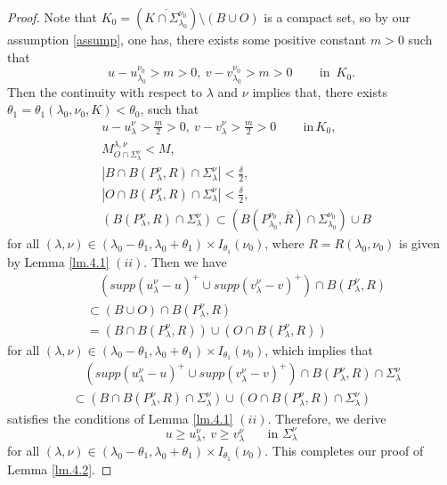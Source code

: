 \documentclass[12pt]{amsart}
\theoremstyle{definition}
\theoremstyle{remark}
\theoremstyle{conclusion}
\theoremstyle{conjecture}
\numberwithin{equation}{section}
\begin{document}
\begin{proof}
Note that $K_0=(\overline{K\cap\Sigma_{\lambda_0}^{\nu_0}}) \setminus (B\cup O)$ is a compact set, so by our assumption \eqref{assump}, one has, there exists some positive constant $m>0$ such that
$$ u-u_{\lambda_0}^{\nu_0}>m>0,\  v-v_{\lambda_0}^{\nu_0}>m>0 \quad\quad \,\mbox{in}\,\,\, K_0. $$
Then the continuity with respect to $\lambda$ and $\nu$ implies that, there exists $\theta_1=\theta_1(\lambda_0,\nu_0,K)<\theta_0$, such that
\begin{align*}
& u-u^{\nu}_{\lambda}> \frac{m}{2}>0,\ v-v^{\nu}_{\lambda}> \frac{m}{2}>0 \qquad \,\mbox{in}\,K_0, \\
& M_{O\cap \Sigma_\lambda^\nu}^{\lambda,\nu}< M, \\
& |B\cap B(P_\lambda^\nu,R) \cap \Sigma_\lambda^\nu |< \frac{\delta}{2},\\
& |O\cap B(P_\lambda^\nu,R) \cap \Sigma_\lambda^\nu |< \frac{\delta}{2},\\
& (B(P_\lambda^\nu,R)\cap \Sigma_\lambda^\nu)\subset (B(P_{\lambda_0}^{\nu_0},\overline{R})\cap \Sigma_{\lambda_0}^{\nu_0}) \cup B
\end{align*}
for all $(\lambda,\nu)\in (\lambda_0-\theta_1, \lambda_0+\theta_1)\times I_{\theta_1}(\nu_0)$, where $R=R(\lambda_0,\nu_0)$ is given by Lemma \ref{lm.4.1} $(ii)$. Then we have
\begin{align*}
     & \quad(supp(u^{\nu}_{\lambda}-u)^+\cup supp(v^{\nu}_{\lambda}-v)^+) \cap B(P_\lambda^\nu,R)\\
     &\subset (B\cup O) \cap B(P_\lambda^\nu,R) \\
     &= (B\cap B(P_\lambda^\nu,R)) \cup (O\cap B(P_\lambda^\nu,R))
\end{align*}
for all $(\lambda,\nu)\in (\lambda_0-\theta_1, \lambda_0+\theta_1)\times I_{\theta_1}(\nu_0)$, which implies that
\begin{align*}
    & \quad(supp(u^{\nu}_{\lambda}-u)^+\cup supp(v^{\nu}_{\lambda}-v)^+) \cap B(P_\lambda^\nu,R)\cap \Sigma_\lambda^\nu\\
    &\subset(B\cap B(P_\lambda^\nu,R)\cap \Sigma_\lambda^\nu) \cup (O\cap B(P_\lambda^\nu,R)\cap \Sigma_\lambda^\nu)
\end{align*}
satisfies the conditions of Lemma \ref{lm.4.1} $(ii)$. Therefore, we derive
$$ u\geq u^{\nu}_{\lambda},\ v\geq v^{\nu}_{\lambda} \quad \,\,\,\,\,\mbox{in}\,\, \Sigma_\lambda^\nu$$
for all $(\lambda,\nu)\in (\lambda_0-\theta_1,\lambda_0+\theta_1)\times I_{\theta_1}(\nu_0)$. This completes our proof of Lemma \ref{lm.4.2}.
\end{proof}
\end{document}
